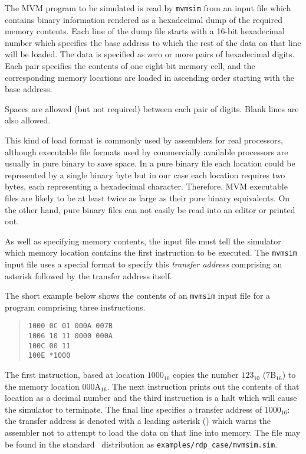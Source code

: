 The MVM program to be simulated is read by {\tt mvmsim} from an input file which contains
binary information rendered as a hexadecimal dump of the required memory contents. 
Each line of the dump file starts with a 16-bit hexadecimal number which
specifies the  base address to which the rest of the data on that line
will be loaded. The data is specified as zero or more pairs of
hexadecimal digits. Each pair specifies the contents of one eight-bit
memory cell, and the corresponding memory locations are loaded in
ascending order starting with the base address.

Spaces are allowed (but not required) between each pair of digits. Blank
lines are also allowed.

This kind of load format is commonly used by assemblers for real
processors, although executable file formats used by commercially
available processors are usually in pure binary to save space. In a pure
binary file each location could be represented by a single binary byte
but in our case each location requires two bytes, each representing a
hexadecimal character. Therefore, MVM executable files are likely to be
at least twice as large as their pure binary equivalents. On the other
hand, pure binary files can not easily be read into an editor or printed
out.

As well as specifying memory contents, the input file must tell the
simulator which memory location contains the first instruction to be
executed. The {\tt mvmsim} input file uses a special format to specify
this {\em transfer address} comprising an asterisk followed by the
transfer address itself.

The short example below shows the contents of an {\tt mvmsim} input file for a program
comprising three instructions. 

\begin{quote}
\small
\begin{verbatim}
1000 0C 01 000A 007B
1006 10 11 0000 000A
100C 00 11
100E *1000
\end{verbatim}
\end{quote}

The first instruction, based at location $1000_{16}$
copies the number $123_{10}$ (7B$_{16}$) to the memory location 000A$_{16}$. The next
instruction prints out the contents of that location as a decimal number and the third 
instruction is a {\sc halt} which will cause the simulator to terminate. The final line
specifies a transfer address of $1000_{16}$: the transfer address is denoted with a leading
asterisk ({\tt *}) which warns the assembler not to attempt to load the data on that line
into memory. The file may be found in the standard \rdp\
distribution as \verb+examples/rdp_case/mvmsim.sim+.

